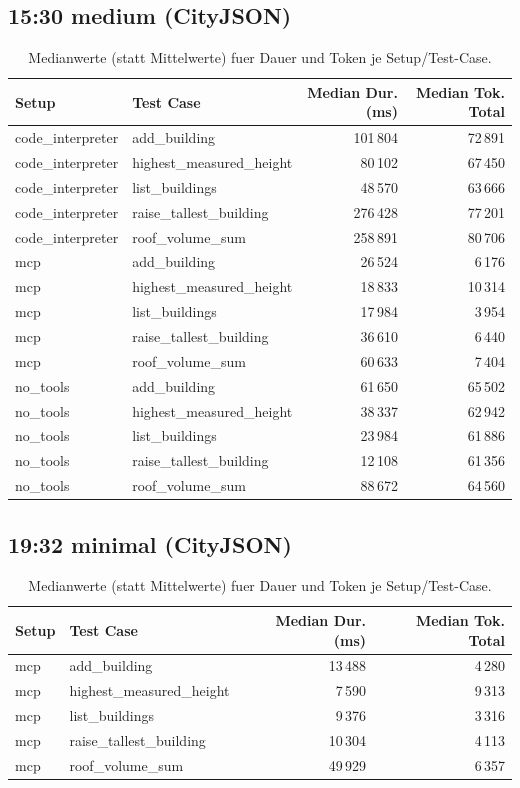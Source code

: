 \subsection*{15:30 medium (CityJSON)}
\begin{table}[H]
\centering
\scriptsize
\begin{tabular}{l l r r}
\toprule
Setup & Test Case & Median Dur. (ms) & Median Tok. Total \\
\midrule
code\_interpreter & add\_building & 101\,804 & 72\,891 \\
code\_interpreter & highest\_measured\_height & 80\,102 & 67\,450 \\
code\_interpreter & list\_buildings & 48\,570 & 63\,666 \\
code\_interpreter & raise\_tallest\_building & 276\,428 & 77\,201 \\
code\_interpreter & roof\_volume\_sum & 258\,891 & 80\,706 \\
\midrule
mcp & add\_building & 26\,524 & 6\,176 \\
mcp & highest\_measured\_height & 18\,833 & 10\,314 \\
mcp & list\_buildings & 17\,984 & 3\,954 \\
mcp & raise\_tallest\_building & 36\,610 & 6\,440 \\
mcp & roof\_volume\_sum & 60\,633 & 7\,404 \\
\midrule
no\_tools & add\_building & 61\,650 & 65\,502 \\
no\_tools & highest\_measured\_height & 38\,337 & 62\,942 \\
no\_tools & list\_buildings & 23\,984 & 61\,886 \\
no\_tools & raise\_tallest\_building & 12\,108 & 61\,356 \\
no\_tools & roof\_volume\_sum & 88\,672 & 64\,560 \\
\bottomrule
\end{tabular}
\caption{Medianwerte (statt Mittelwerte) fuer Dauer und Token je Setup/Test-Case.}
\end{table}

\subsection*{19:32 minimal (CityJSON)}
\begin{table}[H]
\centering
\scriptsize
\begin{tabular}{l l r r}
\toprule
Setup & Test Case & Median Dur. (ms) & Median Tok. Total \\
\midrule
mcp & add\_building & 13\,488 & 4\,280 \\
mcp & highest\_measured\_height & 7\,590 & 9\,313 \\
mcp & list\_buildings & 9\,376 & 3\,316 \\
mcp & raise\_tallest\_building & 10\,304 & 4\,113 \\
mcp & roof\_volume\_sum & 49\,929 & 6\,357 \\
\bottomrule
\end{tabular}
\caption{Medianwerte (statt Mittelwerte) fuer Dauer und Token je Setup/Test-Case.}
\end{table}

